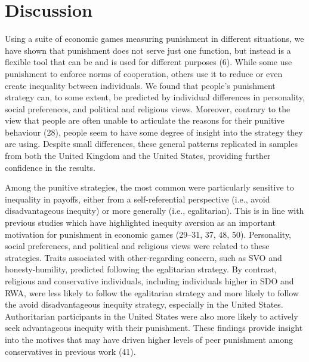 \documentclass[
  man, donotrepeattitle,floatsintext]{apa6}
\begin{document}
\hypertarget{discussion}{%
\section{Discussion}\label{discussion}}

Using a suite of economic games measuring punishment in different situations,
we have shown that punishment does not serve just one function, but instead is
a flexible tool that can be and is used for different purposes (6).
While some use punishment to enforce norms of cooperation, others use it to
reduce or even create inequality between individuals. We found that people's
punishment strategy can, to some extent, be predicted by individual differences
in personality, social preferences, and political and religious views. Moreover,
contrary to the view that people are often unable to articulate the reasons for
their punitive behaviour (28), people seem to have some degree of
insight into the strategy they are using. Despite small differences, these
general patterns replicated in samples from both the United Kingdom and the
United States, providing further confidence in the results.

Among the punitive strategies, the most common were particularly sensitive to
inequality in payoffs, either from a self-referential perspective (i.e., avoid
disadvantageous inequity) or more generally (i.e., egalitarian). This is in
line with previous studies which have highlighted inequity aversion as an
important motivation for punishment in economic games
(29--31, 37, 48, 50).
Personality, social preferences, and political and religious views were related
to these strategies. Traits associated with other-regarding concern, such as SVO
and honesty-humility, predicted following the egalitarian strategy. By contrast,
religious and conservative individuals, including individuals higher in SDO and
RWA, were less likely to follow the egalitarian strategy and more likely to
follow the avoid disadvantageous inequity strategy, especially in the United
States. Authoritarian participants in the United States were also more likely to
actively seek advantageous inequity with their punishment. These findings
provide insight into the motives that may have driven higher levels of peer
punishment among conservatives in previous work (41).
\end{document}

